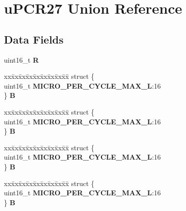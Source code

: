 \hypertarget{unionuPCR27}{}\section{u\+P\+C\+R27 Union Reference}
\label{unionuPCR27}
\subsection*{Data Fields}
\begin{DoxyCompactItemize}
\item 
\mbox{\label{unionuPCR27_aa57f4f9009361d0570998014943b1de6}} 
uint16\+\_\+t {\bfseries R}
\item 
\mbox{\label{unionuPCR27_a2fa354af5f8a13eab816544d15e17dd0}} 
\begin{tabbing}
xx\=xx\=xx\=xx\=xx\=xx\=xx\=xx\=xx\=\kill
struct \{\\
\>uint16\_t {\bfseries MICRO\_PER\_CYCLE\_MAX\_L}:16\\
\} {\bfseries B}\\

\end{tabbing}\item 
\mbox{\label{unionuPCR27_acc0d48e101505c1623060ba2a9358f4e}} 
\begin{tabbing}
xx\=xx\=xx\=xx\=xx\=xx\=xx\=xx\=xx\=\kill
struct \{\\
\>uint16\_t {\bfseries MICRO\_PER\_CYCLE\_MAX\_L}:16\\
\} {\bfseries B}\\

\end{tabbing}\item 
\mbox{\label{unionuPCR27_a393e3a1f8f35260fceea7d74a64f08dd}} 
\begin{tabbing}
xx\=xx\=xx\=xx\=xx\=xx\=xx\=xx\=xx\=\kill
struct \{\\
\>uint16\_t {\bfseries MICRO\_PER\_CYCLE\_MAX\_L}:16\\
\} {\bfseries B}\\

\end{tabbing}\item 
\mbox{\label{unionuPCR27_a0cdcba7625d715273297aca0fe8161c5}} 
\begin{tabbing}
xx\=xx\=xx\=xx\=xx\=xx\=xx\=xx\=xx\=\kill
struct \{\\
\>uint16\_t {\bfseries MICRO\_PER\_CYCLE\_MAX\_L}:16\\
\} {\bfseries B}\\

\end{tabbing}\end{DoxyCompactItemize}


